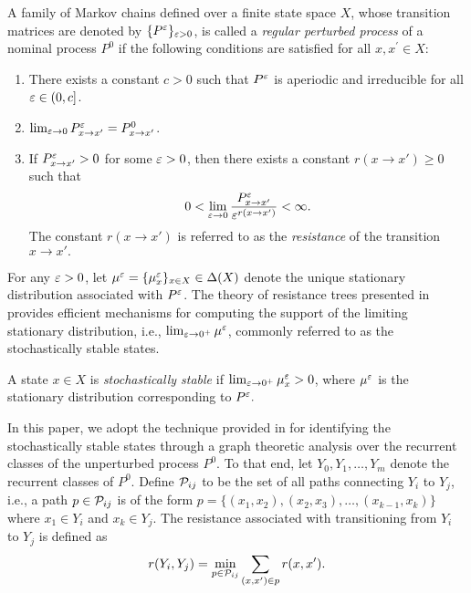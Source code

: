 \begin{defn}\label{d:RPP}%
A family of Markov chains defined over a finite state space $X$, whose transition matrices are denoted by $\{P^\varepsilon\}_{\varepsilon > 0}$, is called a \emph{regular perturbed process} of a nominal process $P^0$ if the following conditions are satisfied for all $x,x^\prime\in X$:
%
\begin{enumerate}
\item There exists a constant $c>0$ such that $P^\varepsilon$ is aperiodic and irreducible for all $\varepsilon \in (0,c]$.
\item $\lim_{\varepsilon\to 0} P^{\varepsilon}_{x \rightarrow x'}= P^0_{x \rightarrow x'}$.%
\item If $P^\varepsilon_{x \rightarrow x'} > 0$ for some $\varepsilon>0$, then there exists a constant $r(x \to x') \geq 0$ such that 
\begin{equation}\label{e:RPP bounds}
0<\lim_{\varepsilon\to 0}
\frac{P^\varepsilon_{x \to x'}}
{\varepsilon^{r(x \to x')}}<\infty.
\end{equation}
The constant $r(x \to x')$ is referred to as the \emph{resistance} of the transition $x \to x'.$
%
\end{enumerate}
\end{defn}

For any $\varepsilon > 0$, let $\mu^{\varepsilon} = \{\mu^{\varepsilon}_x \}_{x \in X}  \in \Delta(X)$ denote the unique stationary distribution associated with $P^{\varepsilon}$.  The theory of resistance trees presented in \cite{Young1993} provides efficient mechanisms for computing the support of the limiting stationary distribution, i.e., $\lim_{\varepsilon \rightarrow 0^+} \mu^{\varepsilon}$, commonly referred to as the stochastically stable states.  

\begin{defn}\label{d:ss}
A state $x \in X$ is \emph{stochastically stable} \cite{Foster1990} if $\lim_{\varepsilon\to 0^+}\mu_x^\varepsilon>0$, where $\mu^\varepsilon$ is the stationary distribution corresponding to $P^\varepsilon.$
\end{defn}

In this paper, we adopt the technique provided in \cite{Young1993} for identifying the stochastically stable states through a graph theoretic analysis over the recurrent classes of the unperturbed process $P^0$.  To that end, let $Y_0, Y_1, \dots, Y_m$ denote the recurrent classes of $P^0$.  Define ${\cal P}_{i j}$ to be the set of all paths connecting $Y_i$ to $Y_j$, i.e., a path $p \in {\cal P}_{i j}$ is of the form $p=\{(x_1, x_2), (x_2, x_3), \dots, (x_{k-1}, x_k)\}$ where $x_1 \in Y_i$ and $x_k \in Y_j$.  The resistance associated with transitioning from $Y_i$ to $Y_j$ is defined as 
%
\begin{equation}\label{eq:321}
r(Y_i , Y_j) = \min_{p \in {\cal P}_{i j}} \sum_{(x,x') \in p} r(x,x'). 
\end{equation}

